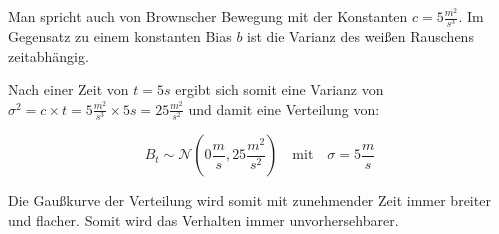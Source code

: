 \documentclass[12pt,a4paper]{report}
\begin{document}
Man spricht auch von Brownscher Bewegung mit der Konstanten \(c = 5 \frac{m^2}{s^3}\). Im Gegensatz zu einem konstanten Bias \(b\) ist die Varianz des weißen Rauschens zeitabhängig.

Nach einer Zeit von \(t=5s\) ergibt sich somit eine Varianz von \(\sigma^2 = c \times t = 5 \frac{m^2}{s^3} \times 5s = 25 \frac{m^2}{s^2}\) und damit eine Verteilung von:

\[
    B_t \sim \mathcal{N}(0 \frac{m}{s}, 25 \frac{m^2}{s^2}) \quad \text{mit} \quad \sigma = 5 \frac{m}{s}
\]

Die Gaußkurve der Verteilung wird somit mit zunehmender Zeit immer breiter und flacher. Somit wird das Verhalten immer unvorhersehbarer.

\clearpage
\printbibliography[heading=bibintoc]
\end{document}
